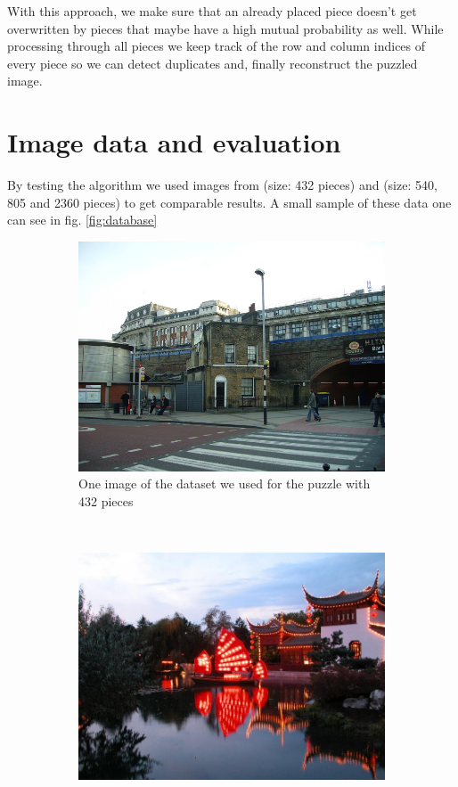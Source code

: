 \documentclass[11pt]{report}
\begin{document}
With this approach, we make sure that an already placed piece doesn't get overwritten by pieces that maybe have a high mutual probability as well. While processing through all pieces we keep track of the row and column indices of every piece so we can detect duplicates and, finally reconstruct the puzzled image.
\newpage

\section{Image data and evaluation}
By testing the algorithm we used images from \cite{Cho2010} (size: 432 pieces) and \cite{Pomeranz2011} (size: 540, 805 and 2360 pieces) to get comparable results. A small sample of these data one can see in fig. \ref{fig:database}

\begin{figure}
	\centering
	\begin{subfigure}[b]{0.45\textwidth}
		\includegraphics[width=\textwidth]{../imData/432/1.png}
		\caption{One image of the dataset we used for the puzzle with 432 pieces}
		\label{img:432}
	\end{subfigure}
	~
	\begin{subfigure}[b]{0.45\textwidth}
		\includegraphics[width=\textwidth]{../imData/540/1.jpg}

\end{subfigure}
\end{figure}
\end{document}
